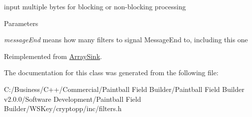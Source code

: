 input multiple bytes for blocking or non-\/blocking processing 
\begin{DoxyParams}{Parameters}
\item[{\em messageEnd}]means how many filters to signal MessageEnd to, including this one \end{DoxyParams}


Reimplemented from \hyperlink{class_array_sink_a2e29344d51a7912e0a88dde1ae4ca556}{ArraySink}.

The documentation for this class was generated from the following file:\begin{DoxyCompactItemize}
\item 
C:/Business/C++/Commercial/Paintball Field Builder/Paintball Field Builder v2.0.0/Software Development/Paintball Field Builder/WSKey/cryptopp/inc/filters.h\end{DoxyCompactItemize}

